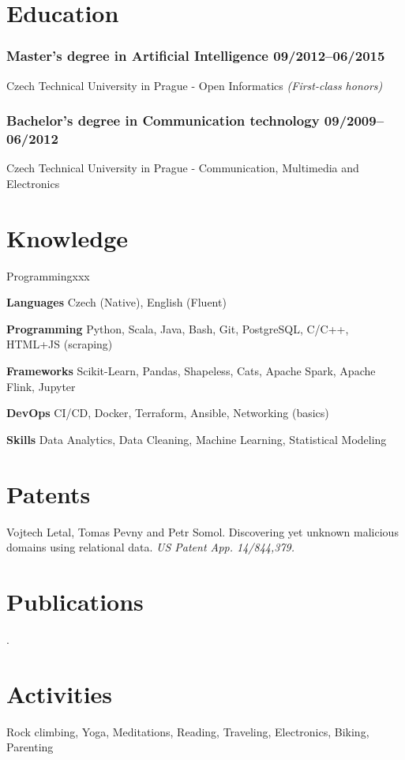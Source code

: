\documentclass[11pt]{article}
\begin{document}
\section*{Education}
\subsubsection*{\bf Master’s degree in Artificial Intelligence \hfill 09/2012--06/2015}
\vspace{-1.5mm}
Czech Technical University in Prague - Open Informatics \textit{(First-class honors)}
\vspace{-1.5mm}
\subsubsection*{\bf Bachelor’s degree in Communication technology \hfill 09/2009--06/2012}
\vspace{-1.5mm}
Czech Technical University in Prague -
Communication, Multimedia and Electronics

\section*{Knowledge}
\begin{labeling}{Programmingxxx}
	\setlength\itemsep{-0.15em}
    \item [\textbf{Languages}] Czech (Native), English (Fluent)
    \item [\textbf{Programming}] Python, Scala, Java, Bash, Git, PostgreSQL, C/C++, HTML+JS (scraping)
    \item [\textbf{Frameworks}] Scikit-Learn, Pandas, Shapeless, Cats, Apache Spark, Apache Flink, Jupyter
    \item [\textbf{DevOps}] CI/CD, Docker, Terraform, Ansible, Networking (basics)
    \item [\textbf{Skills}] Data Analytics, Data Cleaning, Machine Learning, Statistical Modeling
    
\end{labeling}

\section*{Patents}
Vojtech Letal, Tomas Pevny and Petr Somol. Discovering yet unknown malicious domains using relational data. {\it US Patent App. 14/844,379.}



\section*{Publications}
.

\section*{Activities}
Rock climbing, Yoga, Meditations, Reading, Traveling, Electronics, Biking, Parenting

\vfill
\end{document}
